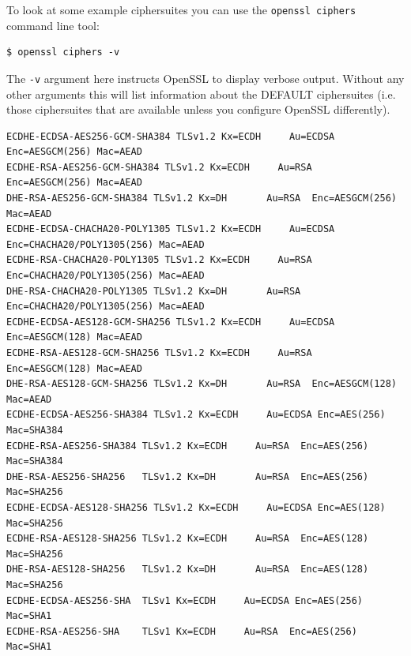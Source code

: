 To look at some example ciphersuites you can use the \lstinline!openssl ciphers!
command line tool:
\begin{verbatim}
$ openssl ciphers -v
\end{verbatim}

The \lstinline!-v! argument here instructs OpenSSL to display verbose output.
Without any other arguments this will list information about the DEFAULT
ciphersuites (i.e. those ciphersuites that are available unless you configure
OpenSSL differently).

\begin{lstlisting}[float=tb,label=lst:ciphers-extract,caption=An
extract from \lstinline!openssl ciphers -v! output]
ECDHE-ECDSA-AES256-GCM-SHA384 TLSv1.2 Kx=ECDH     Au=ECDSA Enc=AESGCM(256) Mac=AEAD
ECDHE-RSA-AES256-GCM-SHA384 TLSv1.2 Kx=ECDH     Au=RSA  Enc=AESGCM(256) Mac=AEAD
DHE-RSA-AES256-GCM-SHA384 TLSv1.2 Kx=DH       Au=RSA  Enc=AESGCM(256) Mac=AEAD
ECDHE-ECDSA-CHACHA20-POLY1305 TLSv1.2 Kx=ECDH     Au=ECDSA Enc=CHACHA20/POLY1305(256) Mac=AEAD
ECDHE-RSA-CHACHA20-POLY1305 TLSv1.2 Kx=ECDH     Au=RSA  Enc=CHACHA20/POLY1305(256) Mac=AEAD
DHE-RSA-CHACHA20-POLY1305 TLSv1.2 Kx=DH       Au=RSA  Enc=CHACHA20/POLY1305(256) Mac=AEAD
ECDHE-ECDSA-AES128-GCM-SHA256 TLSv1.2 Kx=ECDH     Au=ECDSA Enc=AESGCM(128) Mac=AEAD
ECDHE-RSA-AES128-GCM-SHA256 TLSv1.2 Kx=ECDH     Au=RSA  Enc=AESGCM(128) Mac=AEAD
DHE-RSA-AES128-GCM-SHA256 TLSv1.2 Kx=DH       Au=RSA  Enc=AESGCM(128) Mac=AEAD
ECDHE-ECDSA-AES256-SHA384 TLSv1.2 Kx=ECDH     Au=ECDSA Enc=AES(256)  Mac=SHA384
ECDHE-RSA-AES256-SHA384 TLSv1.2 Kx=ECDH     Au=RSA  Enc=AES(256)  Mac=SHA384
DHE-RSA-AES256-SHA256   TLSv1.2 Kx=DH       Au=RSA  Enc=AES(256)  Mac=SHA256
ECDHE-ECDSA-AES128-SHA256 TLSv1.2 Kx=ECDH     Au=ECDSA Enc=AES(128)  Mac=SHA256
ECDHE-RSA-AES128-SHA256 TLSv1.2 Kx=ECDH     Au=RSA  Enc=AES(128)  Mac=SHA256
DHE-RSA-AES128-SHA256   TLSv1.2 Kx=DH       Au=RSA  Enc=AES(128)  Mac=SHA256
ECDHE-ECDSA-AES256-SHA  TLSv1 Kx=ECDH     Au=ECDSA Enc=AES(256)  Mac=SHA1
ECDHE-RSA-AES256-SHA    TLSv1 Kx=ECDH     Au=RSA  Enc=AES(256)  Mac=SHA1
\end{lstlisting}

